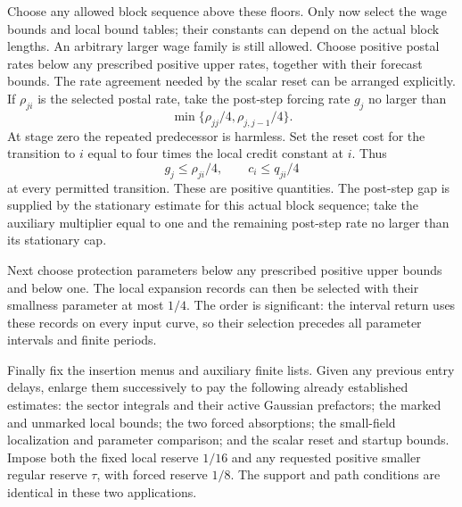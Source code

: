 Choose any allowed block sequence above these floors. Only now select
the wage bounds and local bound tables; their constants can depend on
the actual block lengths. An arbitrary larger wage family is still
allowed. Choose positive postal rates below any prescribed positive
upper rates, together with their forecast bounds. The rate agreement
needed by the scalar reset can be arranged explicitly. If $\rho_{ji}$
is the selected postal rate, take the post-step forcing rate $g_j$ no
larger than
\[
       \min\{\rho_{jj}/4,\rho_{j,j-1}/4\}.
\]
At stage zero the repeated predecessor is harmless. Set the reset
cost for the transition to $i$ equal to four times the local credit
constant at $i$. Thus
\begin{equation}\label{eq:common-reset-coverage}
             g_j\le\rho_{ji}/4,\qquad c_i\le q_{ji}/4
\end{equation}
at every permitted transition. These are positive quantities.
The post-step gap is supplied by the stationary estimate for this
actual block sequence; take the auxiliary multiplier equal to one
and the remaining post-step rate no larger than its stationary cap.

Next choose protection parameters below any prescribed positive
upper bounds and below one. The local expansion records can then be
selected with their smallness parameter at most $1/4$. The order is
significant: the interval return uses these records on every input
curve, so their selection precedes all parameter intervals and finite
periods.

Finally fix the insertion menus and auxiliary finite lists. Given any
previous entry delays, enlarge them successively to pay the following
already established estimates: the sector integrals and their active
Gaussian prefactors; the marked and unmarked local bounds; the two
forced absorptions; the small-field localization and parameter
comparison; and the scalar reset and startup bounds. Impose both the
fixed local reserve $1/16$ and any requested positive smaller regular
reserve $\tau$, with forced reserve $1/8$. The support and path
conditions are identical in these two applications.

